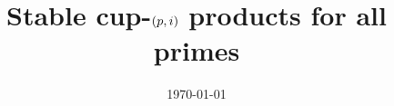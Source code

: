 \documentclass{amsart}
\title{Stable cup-$\lowercase{(p,i)}$ products for all primes}
\date{\today}
\begin{document}
	
	\maketitle
	
	
	
	
	
	
	
	
	
%	
%	
	\sloppy
	\printbibliography
\end{document}
